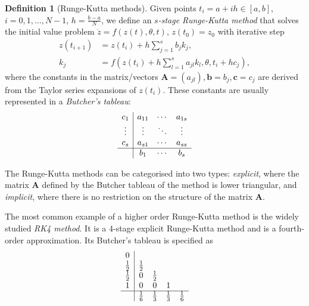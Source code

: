 \documentclass[a4paper,11pt,titlepage]{article}
\theoremstyle{definition}
\newtheorem{definition}{Definition}[section]
\theoremstyle{plain}
\theoremstyle{remark}
\begin{document}
\begin{definition}[Runge-Kutta methods]
    Given points $t_i = a + ih \in \left[a, b\right]$, $i = 0, 1, \dots, N - 1$, $h = \frac{b-a}{N}$, we define an $s$\textit{-stage Runge-Kutta method} that solves the initial value problem $\dot{z}= f(z(t), \theta,t)$, $z(t_0) = z_0$ with iterative step
    \begin{align*}
        z(t_{i+1}) &= z(t_i) + h\sum_{j=1}^s b_j k_j, \\
        k_j &= f\left(z(t_i) + h\sum_{l=1}^s a_{jl}k_l, \theta, t_i + hc_j\right),
    \end{align*}
    where the constants in the matrix/vectors $\mathbf{A} = (a_{jl}), \mathbf{b} = b_j, \mathbf{c} = c_j$ are derived from the Taylor series expansions of $z(t_i)$. These constants are usually represented in a \textit{Butcher's tableau}:
    \begin{equation*}
        \begin{array}{c|ccc}
            c_1 & a_{11} & \cdots & a_{1s} \\
            \vdots & \vdots & \ddots & \vdots  \\
            c_s & a_{s1} & \cdots & a_{ss} \\
            \hline
            & b_1 & \cdots & b_s
        \end{array}
    \end{equation*}
\end{definition}

The Runge-Kutta methods can be categorised into two types: \textit{explicit}, where the matrix $\mathbf{A}$ defined by the Butcher tableau of the method is lower triangular, and \textit{implicit}, where there is no restriction on the structure of the matrix $\mathbf{A}$. 

The most common example of a higher order Runge-Kutta method is the widely studied \textit{RK4 method}. It is a $4$-stage explicit Runge-Kutta method and is a fourth-order approximation. Its Butcher's tableau is specified as
\begin{equation*}
    \begin{array}{c|cccc}
        0  \\
        \frac{1}{2} & \frac{1}{2} \\
        \frac{1}{2} & 0 & \frac{1}{2} \\
        1 & 0 & 0 & 1 \\
        \hline
        & \frac{1}{6} & \frac{1}{3} & \frac{1}{3} & \frac{1}{6} \\
    \end{array}
\end{equation*}
\end{document}
